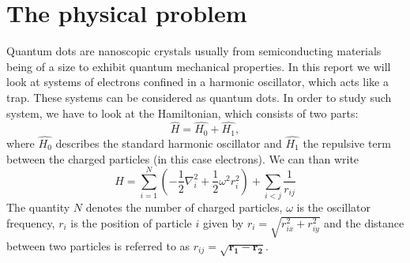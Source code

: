 \section{The physical problem}\label{sec:problem}
Quantum dots are nanoscopic crystals usually from semiconducting materials being of a size to exhibit quantum mechanical properties. In this report we will look at systems of electrons confined in a harmonic oscillator, which acts like a trap. These systems can be considered as quantum dots. In order to study such system, we have to look at the Hamiltonian, which consists of two parts:
\begin{equation}
\hat{H} = \hat{H_0} + \hat{H_1},
\end{equation}
where $\hat{H_0}$ describes the standard harmonic oscillator and $\hat{H_1}$ the repulsive term between the charged particles (in this case electrons). We can than write
\begin{equation}
\hat{H} = \sum_{i=1}^N \left( -\frac{1}{2} \nabla_i^2 + \frac{1}{2} \omega^2 r_i^2 \right) + \sum_{i<j} \frac{1}{r_{ij}}
\end{equation}
The quantity $N$ denotes the number of charged particles, $\omega$ is the oscillator frequency, $r_i$ is the position of particle $i$ given by $r_i = \sqrt{r_{ix}^2 + r_{iy}^2}$ and the distance between two particles is referred to as $r_{ij} = \sqrt{\mathbf{r_1}- \mathbf{r_2}}$.\\
